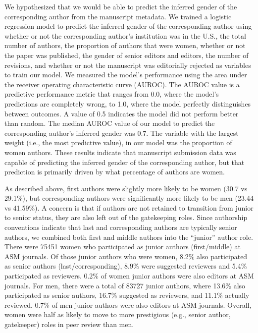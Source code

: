 \documentclass[11pt,]{article}
\begin{document}
We hypothesized that we would be able to predict the inferred gender of
the corresponding author from the manuscript metadata. We trained a
logistic regression model to predict the inferred gender of the
corresponding author using whether or not the corresponding author's
institution was in the U.S., the total number of authors, the proportion
of authors that were women, whether or not the paper was published, the
gender of senior editors and editors, the number of revisions, and
whether or not the manuscript was editorially rejected as variables to
train our model. We measured the model's performance using the area
under the receiver operating characteristic curve (AUROC). The AUROC
value is a predictive performance metric that ranges from 0.0, where the
model's predictions are completely wrong, to 1.0, where the model
perfectly distinguishes between outcomes. A value of 0.5 indicates the
model did not perform better than random. The median AUROC value of our
model to predict the corresponding author's inferred gender was 0.7. The
variable with the largest weight (i.e., the most predictive value), in
our model was the proportion of women authors. These results indicate
that manuscript submission data was capable of predicting the inferred
gender of the corresponding author, but that prediction is primarily
driven by what percentage of authors are women.

As described above, first authors were slightly more likely to be women
(30.7 vs 29.1\%), but corresponding authors were significantly more
likely to be men (23.44 vs 41.59\%). A concern is that if authors are
not retained to transition from junior to senior status, they are also
left out of the gatekeeping roles. Since authorship conventions indicate
that last and corresponding authors are typically senior authors, we
combined both first and middle authors into the ``junior'' author role.
There were 75451 women who participated as junior authors (first/middle)
at ASM journals. Of those junior authors who were women, 8.2\% also
participated as senior authors (last/corresponding), 8.9\% were
suggested reviewers and 5.4\% participated as reviewers. 0.2\% of women
junior authors were also editors at ASM journals. For men, there were a
total of 83727 junior authors, where 13.6\% also participated as senior
authors, 16.7\% suggested as reviewers, and 11.1\% actually reviewed.
0.7\% of men junior authors were also editors at ASM journals. Overall,
women were half as likely to move to more prestigious (e.g., senior
author, gatekeeper) roles in peer review than men.
\end{document}

